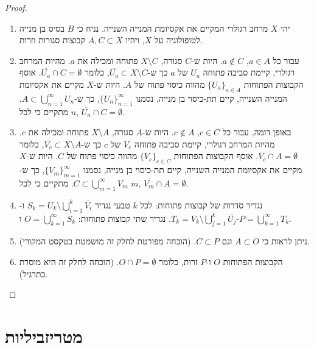 \documentclass{tstextbook}
\begin{document}
\begin{proof}
  \begin{enumerate}
    \item יהי \(X\) מרחב רגולרי המקיים את אקסיומת המנייה השנייה. נניח כי \(B\) בסיס בן מנייה לטופולוגיה על \(X\), ויהיו \(A, C \subset X\) קבוצות סגורות וזרות. 


    \item עבור כל \(a \in A\), \(a \notin C\). היות ש-\(C\) סגורה, \(X \setminus C\) פתוחה ומכילה את \(a\). מהיות המרחב רגולרי, קיימת סביבה פתוחה \(U_a\) של \(a\) כך ש-\(\overline{U_a} \subset X \setminus C\), כלומר \(\overline{U_a} \cap C = \emptyset\). אוסף הקבוצות הפתוחות \(\{U_a\}_{a \in A}\) מהווה כיסוי פתוח של \(A\). היות ש-\(X\) מקיים את אקסיומת המנייה השנייה, קיים תת-כיסוי בן מנייה, נסמנו \(\{U_n\}_{n=1}^\infty\), כך ש-\(A \subset \bigcup_{n=1}^\infty U_n\). מתקיים כי לכל \(n\), \(\overline{U_n} \cap C = \emptyset\). 


    \item באופן דומה, עבור כל \(c \in C\), \(c \notin A\). היות ש-\(A\) סגורה, \(X \setminus A\) פתוחה ומכילה את \(c\). מהיות המרחב רגולרי, קיימת סביבה פתוחה \(V_c\) של \(c\) כך ש-\(\overline{V_c} \subset X \setminus A\), כלומר \(\overline{V_c} \cap A = \emptyset\). אוסף הקבוצות הפתוחות \(\{V_c\}_{c \in C}\) מהווה כיסוי פתוח של \(C\). היות ש-\(X\) מקיים את אקסיומת המנייה השנייה, קיים תת-כיסוי בן מנייה, נסמנו \(\{V_m\}_{m=1}^\infty\), כך ש-\(C \subset \bigcup_{m=1}^\infty V_m\). מתקיים כי לכל \(m\), \(\overline{V_m} \cap A = \emptyset\). 


    \item נגדיר סדרות של קבוצות פתוחות: לכל \(k\) טבעי נגדיר \(S_k = U_k \setminus \bigcup_{i=1}^k \overline{V_i}\) ו-\(T_k = V_k \setminus \bigcup_{j=1}^k \overline{U_j}\). נגדיר שתי קבוצות פתוחות: \(O = \bigcup_{k=1}^\infty S_k\) ו-\(P = \bigcup_{k=1}^\infty T_k\). 


    \item ניתן לראות כי \(A \subset O\) וגם \(C \subset P\). (הוכחה מפורטת לחלק זה מושמטת בטקסט המקורי). 


    \item הקבוצות הפתוחות \(O\) ו-\(P\) זרות, כלומר \(O \cap P = \emptyset\). (הוכחה לחלק זה היא מוסרת כתרגיל). 


  \end{enumerate}
\end{proof}
\section{מטריזביליות}
\end{document}
